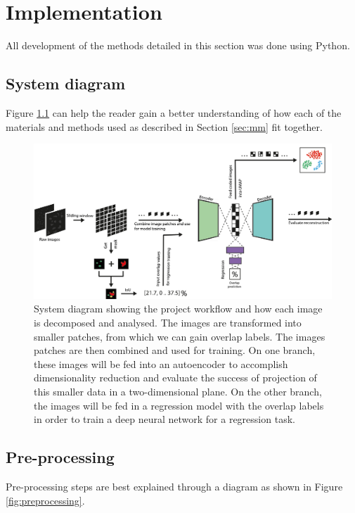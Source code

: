 \chapter{Implementation} \label{sec:implementation}

All development of the methods detailed in this section was done using Python. 

\section{System diagram}

Figure \ref{fig:system} can help the reader gain a better understanding of how each of the materials and methods used as described in Section \ref{sec:mm} fit together.

\begin{figure}[h!]
    \centering
    \includegraphics[width=\textwidth]{dissertation/figures/system_diagram.pdf}
    \caption{System diagram showing the project workflow and how each image is decomposed and analysed. The images are transformed into smaller patches, from which we can gain overlap labels. The images patches are then combined and used for training. On one branch, these images will be fed into an autoencoder to accomplish dimensionality reduction and evaluate the success of projection of this smaller data in a two-dimensional plane. On the other branch, the images will be fed in a regression model with the overlap labels in order to train a deep neural network for a regression task.}
    \label{fig:system}
\end{figure}

\section{Pre-processing}

Pre-processing steps are best explained through a diagram as shown in Figure \ref{fig:preprocessing}. 

